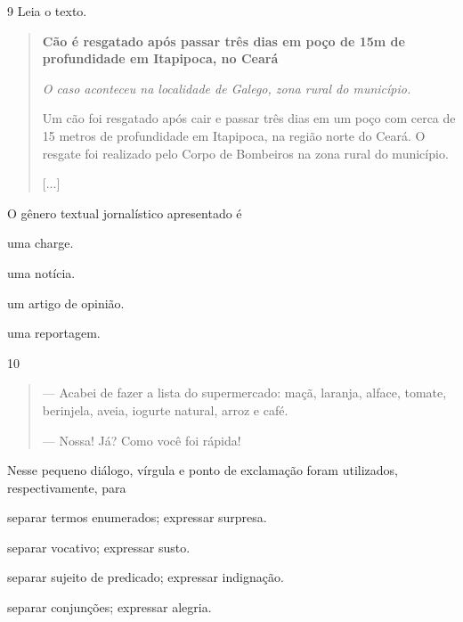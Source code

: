 \num{9} Leia o texto.

\begin{quote}
\textbf{Cão é resgatado após passar três dias em poço de 15m de profundidade em Itapipoca, no Ceará}

\emph{O caso aconteceu na localidade de Galego, zona rural do município.}

Um cão foi resgatado após cair e passar três dias em um poço com cerca
de 15 metros de profundidade em
Itapipoca, na
região norte do Ceará. O resgate foi realizado pelo Corpo de Bombeiros
na zona rural do município.

{[}...{]}

\end{quote}

O gênero textual jornalístico apresentado é

\begin{escolha}
\item uma charge.

\item uma notícia.

\item um artigo de opinião.

\item uma reportagem.
\end{escolha}

\num{10}

\begin{quote}
--- Acabei de fazer a lista do supermercado: maçã, laranja, alface,
tomate, berinjela, aveia, iogurte natural, arroz e café.

--- Nossa! Já? Como você foi rápida!
\end{quote}

Nesse pequeno diálogo, vírgula e ponto de exclamação foram utilizados,
respectivamente, para

\begin{escolha}
\item separar termos enumerados; expressar surpresa.

\item separar vocativo; expressar susto.

\item separar sujeito de predicado; expressar indignação.

\item separar conjunções; expressar alegria.
\end{escolha}

